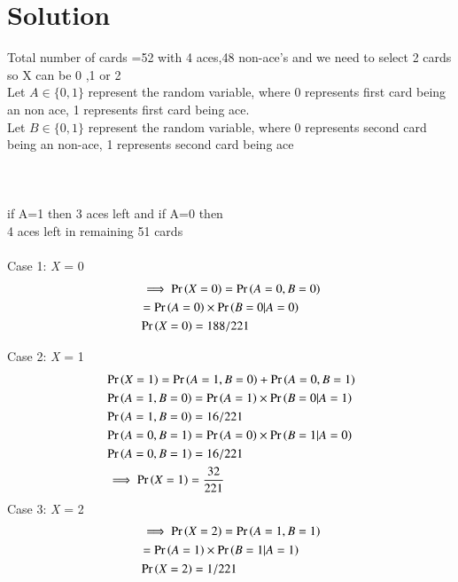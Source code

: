 \documentclass[journal,12pt,twocolumn]{IEEEtran}
\begin{document}
\section{Solution}
Total number of cards =52 with 4 aces,48 non-ace's and we need to select 2 cards
so X can be 0 ,1 or 2\\ 

Let $A \in \{0,1\}$ represent the random variable, where 0 represents first card being an non ace, 1 represents first card being ace. \\
Let $B \in \{0,1\}$ represent the random variable, where 0 represents second card being an non-ace, 1 represents second card being ace \\ \\
\hfill \\ \\
if A=1 then 3 aces left and if A=0 then\\ 4 aces left in remaining 51 cards\\ \\ 
Case 1: \emph{X} = 0
\begin{align}
\nonumber
&\implies \Pr\left(X=0\right)=\Pr\left(A=0,B=0\right)\\ \nonumber
&=\Pr\left(A=0\right)\times \Pr\left(B=0|A=0\right)\\ \nonumber
&\Pr\left(X=0\right) =188/221\\
\end{align}

Case 2: \emph{X} = 1
\begin{align}
\nonumber
&\Pr\left(X=1\right)=\Pr\left(A=1,B=0\right)+\Pr\left(A=0,B=1\right)\\ \nonumber 
&\Pr\left(A=1,B=0\right)=\Pr\left(A=1\right)\times \Pr\left(B=0|A=1\right)\\ \nonumber
&\Pr\left(A=1,B=0\right) =16/221\\ \nonumber
&\Pr\left(A=0,B=1\right)=\Pr\left(A=0\right)\times \Pr\left(B=1|A=0\right)\\ \nonumber
&\Pr\left(A=0,B=1\right) =16/221\\ \nonumber
&\implies\Pr\left(X=1\right)=\frac{32}{221}\\
\end{align}
Case 3: \emph{X} = 2
\begin{align}
\nonumber
&\implies \Pr\left(X=2\right)=\Pr\left(A=1,B=1\right)\\ \nonumber
& =\Pr\left(A=1\right)\times\Pr\left(B=1|A=1\right)\\ \nonumber
& \Pr\left(X=2\right)=1/221\\
\end{align}
\end{document}
